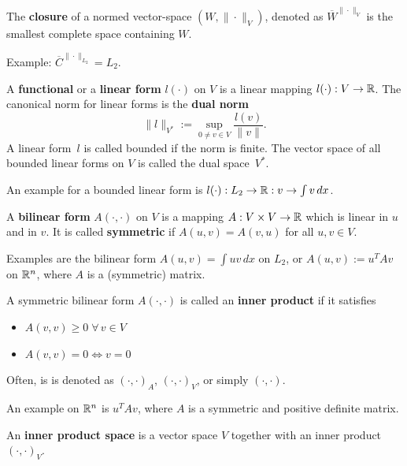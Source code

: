 \begin{definition} The {\bf closure} of a normed vector-space $(W, \| \cdot \|_V)$,
denoted as $\overline{W}^{\| \cdot \|_V}$ is the smallest complete space containing $W$.
\end{definition}
Example: $\overline{ C }^{\| \cdot \|_{L_2}} = L_2$.


\begin{definition} A {\bf functional} or a {\bf linear form} $l(\cdot)$ on $V$ is a linear mapping 
$l(\cdot) : V \rightarrow {\mathbb R}$. 
The canonical norm for linear forms is the {\bf dual norm}
$$
\| l \|_{V^\ast} := \sup_{0 \neq v \in V} \frac{l(v)}{\|v\|}.
$$
A linear form~$l$ is called bounded if the norm is finite.
The vector space of all bounded linear forms on $V$ is called the 
dual space~$V^\ast$.
\end{definition}
\noindent
An example for a bounded linear form is 
$l(\cdot) : L_2 \rightarrow {\mathbb R} : v \rightarrow \int v \, dx$.

\begin{definition} A {\bf bilinear form} $A(\cdot,\cdot)$ on $V$ is a mapping
$A : V \times V \rightarrow {\mathbb R}$ which is linear in $u$ and in $v$. It 
is called {\bf symmetric} if $A(u,v) = A(v,u)$ for all $u,v \in V$.
\end{definition}
\noindent
Examples are the bilinear form $A(u,v) = \int u v \, dx$ on $L_2$, or 
$A(u,v) := u^T A v$ on ${\mathbb R}^n$, where $A$ is a (symmetric) matrix.


\begin{definition} A symmetric bilinear form $A(\cdot,\cdot)$ is 
called an {\bf inner product} if it satisfies
\begin{itemize}
\item$A(v,v) \geq 0 \; \forall  \, v \in V$
\item$A(v,v) = 0 \Leftrightarrow v = 0$
\end{itemize}
Often, is is denoted as $(\cdot,\cdot)_A$, $(\cdot,\cdot)_V$, or simply $(\cdot,\cdot)$.
\end{definition}
\noindent
An example on ${\mathbb R}^n$ is $u^T A v$, where $A$ is a symmetric and positive
definite matrix.

\begin{definition} An {\bf inner product space} is a vector space $V$ together
with an inner product $(\cdot, \cdot)_V$.
\end{definition}


